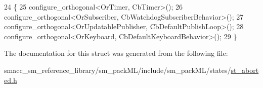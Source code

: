 \begin{DoxyCode}
24     \{
25         configure\_orthogonal<OrTimer, CbTimer>();   
26         configure\_orthogonal<OrSubscriber, CbWatchdogSubscriberBehavior>();
27         configure\_orthogonal<OrUpdatablePublisher, CbDefaultPublishLoop>();
28         configure\_orthogonal<OrKeyboard, CbDefaultKeyboardBehavior>();
29     \}
\end{DoxyCode}


The documentation for this struct was generated from the following file\+:\begin{DoxyCompactItemize}
\item 
smacc\+\_\+sm\+\_\+reference\+\_\+library/sm\+\_\+pack\+M\+L/include/sm\+\_\+pack\+M\+L/states/\hyperlink{sm__packML_2include_2sm__packML_2states_2st__aborted_8h}{st\+\_\+aborted.\+h}\end{DoxyCompactItemize}
